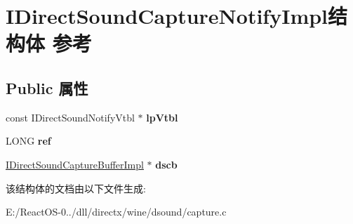 \hypertarget{struct_i_direct_sound_capture_notify_impl}{}\section{I\+Direct\+Sound\+Capture\+Notify\+Impl结构体 参考}
\label{struct_i_direct_sound_capture_notify_impl}
\subsection*{Public 属性}
\begin{DoxyCompactItemize}
\item 
\mbox{\label{struct_i_direct_sound_capture_notify_impl_a6edad0e38bb4a38abf412745b7b22dc2}} 
const I\+Direct\+Sound\+Notify\+Vtbl $\ast$ {\bfseries lp\+Vtbl}
\item 
\mbox{\label{struct_i_direct_sound_capture_notify_impl_ab4e1fac91a6fe4cddb9a6f1207a51ba2}} 
L\+O\+NG {\bfseries ref}
\item 
\mbox{\label{struct_i_direct_sound_capture_notify_impl_ac6cdc039b9043853e8e32a641be639d4}} 
\hyperlink{struct_i_direct_sound_capture_buffer_impl}{I\+Direct\+Sound\+Capture\+Buffer\+Impl} $\ast$ {\bfseries dscb}
\end{DoxyCompactItemize}


该结构体的文档由以下文件生成\+:\begin{DoxyCompactItemize}
\item 
E\+:/\+React\+O\+S-\/0../dll/directx/wine/dsound/capture.\+c\end{DoxyCompactItemize}

